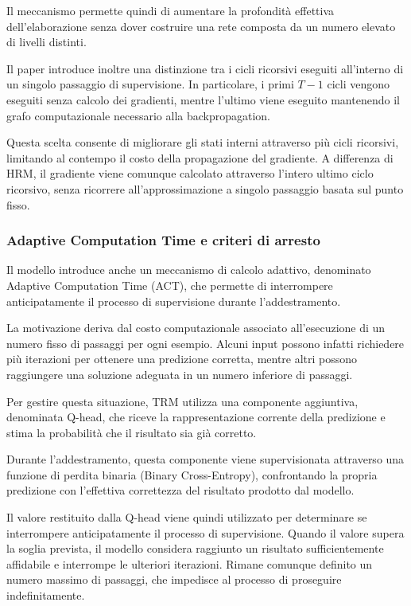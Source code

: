 Il meccanismo permette quindi di aumentare la profondità effettiva dell'elaborazione senza dover costruire una rete composta da un numero elevato di livelli distinti.

Il paper introduce inoltre una distinzione tra i cicli ricorsivi eseguiti all'interno di un singolo passaggio di supervisione. In particolare, i primi \(T-1\) cicli vengono eseguiti senza calcolo dei gradienti, mentre l'ultimo viene eseguito mantenendo il grafo computazionale necessario alla backpropagation.

Questa scelta consente di migliorare gli stati interni attraverso più cicli ricorsivi, limitando al contempo il costo della propagazione del gradiente. A differenza di HRM, il gradiente viene comunque calcolato attraverso l'intero ultimo ciclo ricorsivo, senza ricorrere all'approssimazione a singolo passaggio basata sul punto fisso.

\subsubsection{Adaptive Computation Time e criteri di arresto}

Il modello introduce anche un meccanismo di calcolo adattivo, denominato Adaptive Computation Time (ACT), che permette di interrompere anticipatamente il processo di supervisione durante l'addestramento.

La motivazione deriva dal costo computazionale associato all'esecuzione di un numero fisso di passaggi per ogni esempio. Alcuni input possono infatti richiedere più iterazioni per ottenere una predizione corretta, mentre altri possono raggiungere una soluzione adeguata in un numero inferiore di passaggi.

Per gestire questa situazione, TRM utilizza una componente aggiuntiva, denominata Q-head, che riceve la rappresentazione corrente della predizione e stima la probabilità che il risultato sia già corretto.

Durante l'addestramento, questa componente viene supervisionata attraverso una funzione di perdita binaria (Binary Cross-Entropy), confrontando la propria predizione con l'effettiva correttezza del risultato prodotto dal modello.

Il valore restituito dalla Q-head viene quindi utilizzato per determinare se interrompere anticipatamente il processo di supervisione. Quando il valore supera la soglia prevista, il modello considera raggiunto un risultato sufficientemente affidabile e interrompe le ulteriori iterazioni. Rimane comunque definito un numero massimo di passaggi, che impedisce al processo di proseguire indefinitamente.

